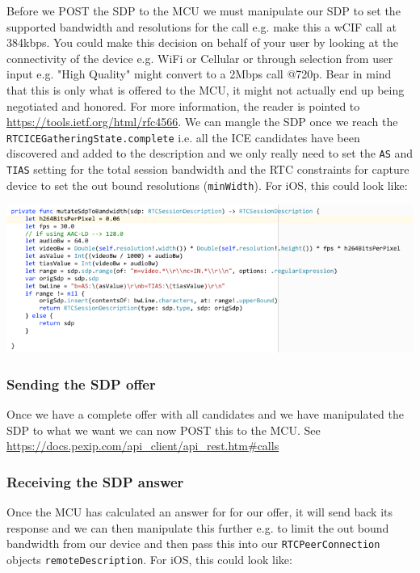 \documentclass[a4paper,11pt]{article}
\begin{document}
Before we POST the SDP to the MCU we must manipulate our SDP to set
the supported bandwidth and resolutions for the call e.g. make this a
wCIF call at 384kbps.  You could make this decision on behalf of your
user by looking at the connectivity of the device e.g. WiFi or
Cellular or through selection from user input e.g. "High Quality"
might convert to a 2Mbps call @720p.  Bear in mind that this is only
what is offered to the MCU, it might not actually end up being
negotiated and honored.  For more information, the reader is pointed
to \url{https://tools.ietf.org/html/rfc4566}.  We can mangle the SDP once we
reach the \texttt{RTCICEGatheringState.complete} i.e. all the ICE candidates
have been discovered and added to the description and we only really
need to set the \texttt{AS} and \texttt{TIAS} setting for the total session
bandwidth and the RTC constraints for capture device to set the out bound
resolutions (\texttt{minWidth}).  For iOS, this could look like:

\begin{center}
\includegraphics[width=.9\linewidth]{./images/sdp_mutation_functions.png}
\end{center}

\subsubsection{Sending the SDP offer}
\label{sec:org6291cff}

Once we have a complete offer with all candidates and we have
manipulated the SDP to what we want we can now POST this to the MCU.  
See \url{https://docs.pexip.com/api\_client/api\_rest.htm\#calls}

\subsubsection{Receiving the SDP answer}
\label{sec:org7e13dac}

Once the MCU has calculated an answer for for our offer, it will send
back its response and we can then manipulate this further e.g. to
limit the out bound bandwidth from our device and then pass this into
our \texttt{RTCPeerConnection} objects \texttt{remoteDescription}. For iOS, this
could look like:
\end{document}
